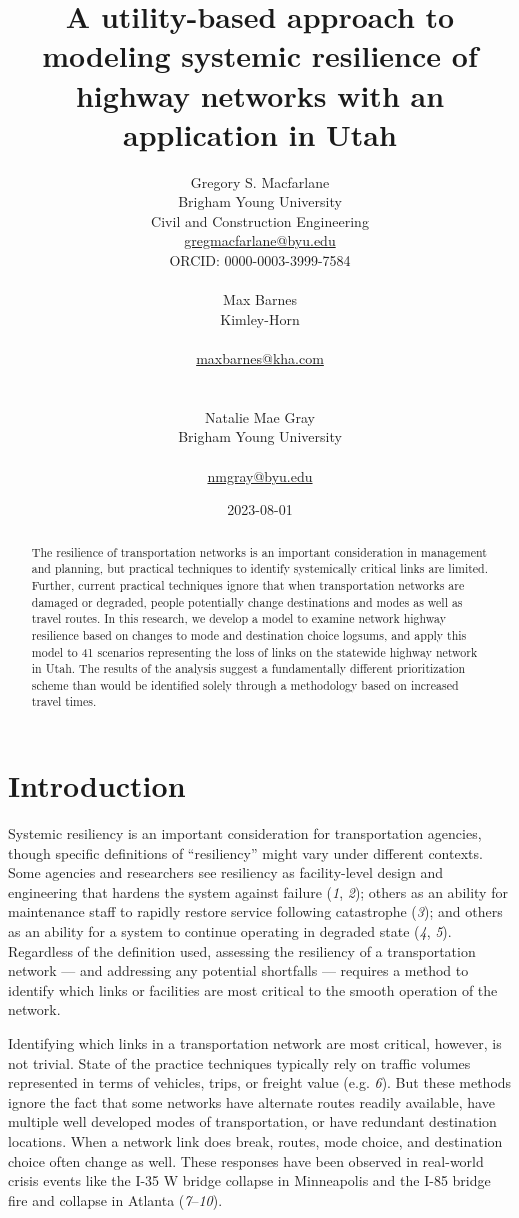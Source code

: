 \documentclass[
  letterpaper,
]{trb}
\title{A utility-based approach to modeling systemic resilience of
highway networks with an application in Utah}
\author{
Gregory S. Macfarlane\\Brigham Young University\\Civil and Construction
Engineering\\\href{mailto:gregmacfarlane@byu.edu}{gregmacfarlane@byu.edu}\\ORCID: 0000-0003-3999-7584\\ \\ 
Max
Barnes\\Kimley-Horn\\\\\href{mailto:maxbarnes@kha.com}{maxbarnes@kha.com}\\\\ \\ 
Natalie Mae Gray\\Brigham Young
University\\\\\href{mailto:nmgray@byu.edu}{nmgray@byu.edu}\\}
\date{2023-08-01}
\begin{document}
\maketitle
\newpage
\begin{abstract}
The resilience of transportation networks is an important consideration
in management and planning, but practical techniques to identify
systemically critical links are limited. Further, current practical
techniques ignore that when transportation networks are damaged or
degraded, people potentially change destinations and modes as well as
travel routes. In this research, we develop a model to examine network
highway resilience based on changes to mode and destination choice
logsums, and apply this model to 41 scenarios representing the loss of
links on the statewide highway network in Utah. The results of the
analysis suggest a fundamentally different prioritization scheme than
would be identified solely through a methodology based on increased
travel times.
\end{abstract}
\newpage
\ifdefined\Shaded\renewenvironment{Shaded}{\begin{tcolorbox}[interior hidden, breakable, borderline west={3pt}{0pt}{shadecolor}, boxrule=0pt, sharp corners, enhanced, frame hidden]}{\end{tcolorbox}}\fi


\hypertarget{intro}{%
\section{Introduction}\label{intro}}

Systemic resiliency is an important consideration for transportation
agencies, though specific definitions of ``resiliency'' might vary under
different contexts. Some agencies and researchers see resiliency as
facility-level design and engineering that hardens the system against
failure (\emph{1}, \emph{2}); others as an ability for maintenance staff
to rapidly restore service following catastrophe (\emph{3}); and others
as an ability for a system to continue operating in degraded state
(\emph{4}, \emph{5}). Regardless of the definition used, assessing the
resiliency of a transportation network --- and addressing any potential
shortfalls --- requires a method to identify which links or facilities
are most critical to the smooth operation of the network.

Identifying which links in a transportation network are most critical,
however, is not trivial. State of the practice techniques typically rely
on traffic volumes represented in terms of vehicles, trips, or freight
value (e.g. \emph{6}). But these methods ignore the fact that some
networks have alternate routes readily available, have multiple well
developed modes of transportation, or have redundant destination
locations. When a network link does break, routes, mode choice, and
destination choice often change as well. These responses have been
observed in real-world crisis events like the I-35 W bridge collapse in
Minneapolis and the I-85 bridge fire and collapse in Atlanta
(\emph{7}--\emph{10}).
\end{document}
